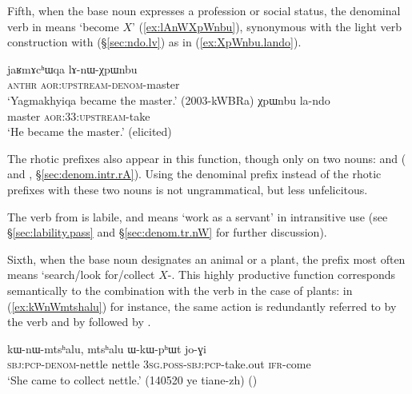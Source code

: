  Fifth, when the base noun expresses a profession or social status, the denominal verb in  means `become $X$' (\ref{ex:lAnWXpWnbu}), synonymous with the light verb construction with  (§\ref{sec:ndo.lv}) as in (\ref{ex:XpWnbu.lando}). 
  
 \begin{exe}
\ex 
 \begin{xlist}
 \ex \label{ex:lAnWXpWnbu}
\gll jaʁmɤcʰɯqa lɤ-nɯ-χpɯnbu  \\
\textsc{anthr} \textsc{aor}:\textsc{upstream}-\textsc{denom}-master \\
\glt `Yagmakhyiqa became the master.' (2003-kWBRa)
 \ex \label{ex:XpWnbu.lando}
\gll χpɯnbu la-ndo \\
 master \textsc{aor}:3\fl{}3:\textsc{upstream}-take \\
\glt `He became the master.' (elicited)
\end{xlist}
\end{exe}

The rhotic prefixes also appear in this function, though only on two nouns:  and  ( and , §\ref{sec:denom.intr.rA}). Using the  denominal prefix instead of the rhotic prefixes with these two nouns is not ungrammatical, but less unfelicitous.

The verb  from   is labile, and means `work as a servant' in intransitive use (see §\ref{sec:lability.pass}  and §\ref{sec:denom.tr.nW} for further discussion).
  
 Sixth, when the base noun designates an animal or a plant, the  prefix most often means `search/look for/collect $X$-. This highly productive function corresponds semantically to the combination with the verb  in the case of plants: in (\ref{ex:kWnWmtshalu}) for instance, the same action is redundantly referred to by the verb  and by  followed by .
 
 \begin{exe}
\ex \label{ex:kWnWmtshalu}
\gll  kɯ-nɯ-mtsʰalu, mtsʰalu ɯ-kɯ-pʰɯt jo-ɣi   \\
\textsc{sbj}:\textsc{pcp}-\textsc{denom}-nettle nettle \textsc{3sg}.\textsc{poss}-\textsc{sbj}:\textsc{pcp}-take.out \textsc{ifr}-come \\
\glt `She came to collect nettle.' (140520 ye tiane-zh) 
()
\end{exe}
 

